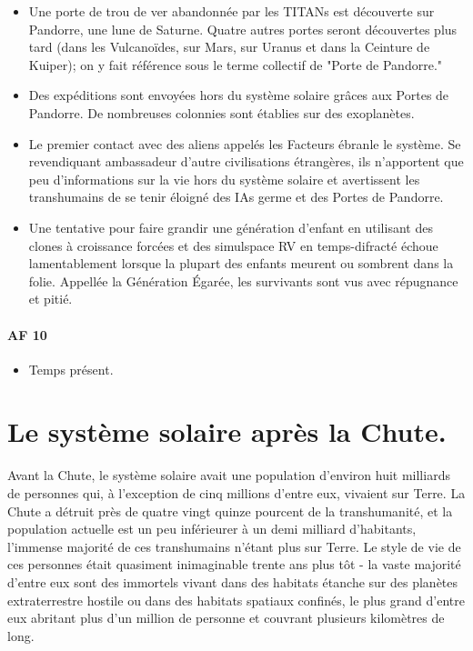 \begin{itemize} \item Une porte de trou de ver abandonnée par les TITANs est découverte sur Pandorre, une lune de Saturne. Quatre autres portes seront découvertes plus tard (dans les Vulcanoïdes, sur Mars, sur Uranus et dans la Ceinture de Kuiper); on y fait référence sous le terme collectif de "Porte de Pandorre." \item Des expéditions sont envoyées hors du système solaire grâces aux Portes de Pandorre. De nombreuses colonnies sont établies sur des exoplanètes. \item Le premier contact avec des aliens appelés les Facteurs ébranle le système. Se revendiquant ambassadeur d'autre civilisations étrangères, ils n'apportent que peu d'informations sur la vie hors du système solaire et avertissent les transhumains de se tenir éloigné des IAs germe et des Portes de Pandorre. \item Une tentative pour faire grandir une génération d'enfant en utilisant des clones à croissance forcées et des simulspace RV en temps-difracté échoue lamentablement lorsque la plupart des enfants meurent ou sombrent dans la folie. Appellée la Génération Égarée, les survivants sont vus avec répugnance et pitié. \end{itemize} \paragraph{AF 10} \begin{itemize} \item Temps présent. \end{itemize} 

\section{Le système solaire après la Chute.} \label{sec:solar-system-after} 

Avant la Chute, le système solaire avait une population d'environ huit milliards de personnes qui, à l'exception de cinq millions d'entre eux, vivaient sur Terre. La Chute a détruit près de quatre vingt quinze pourcent de la transhumanité, et la population actuelle est un peu inférieurer à un demi milliard d'habitants, l'immense majorité de ces transhumains n'étant plus sur Terre. Le style de vie de ces personnes était quasiment inimaginable trente ans plus tôt - la vaste majorité d'entre eux sont des immortels vivant dans des habitats étanche sur des planètes extraterrestre hostile ou dans des habitats spatiaux confinés, le plus grand d'entre eux abritant plus d'un million de personne et couvrant plusieurs kilomètres de long. 

